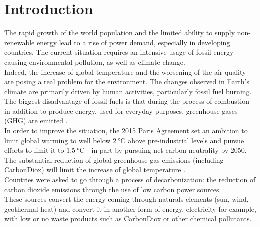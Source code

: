 \chapter{Introduction}

%
The rapid growth of the world population and the limited ability to supply non-renewable energy lead to a rise of power demand, especially in developing countries. The current situation requires an intensive usage of fossil energy causing environmental pollution, as well as climate change. \\

Indeed, the increase of global temperature and the worsening of the air quality are posing a real problem for the environment. The changes observed in Earth’s climate are primarily driven by human activities, particularly fossil fuel burning. The biggest disadvantage of fossil fuels is that during the process of combustion in addition to produce energy, used for everyday purposes, greenhouse gases (\gls{GHG}) are emitted \cite{greenhousegasemissions}. \\

In order to improve the situation, the 2015 Paris Agreement set an ambition to limit global warming to well below $\SI{2}{\degreeCelsius}$ above pre-industrial levels and pursue efforts to limit it to $\SI{1.5}{\degreeCelsius}$ - in part by pursuing net carbon neutrality by 2050. The substantial reduction of global greenhouse gas emissions (including \gls{CarbonDiox})  will limit the increase of global temperature \cite{french_conference}. \\
Countries were asked to go through a process of decarbonization: the reduction of carbon dioxide emissions through the use of low carbon power sources. \\
These sources convert the energy coming through naturals elements (sun, wind, geothermal heat) and convert it in another form of energy, electricity for example, with low or no waste products such as \gls{CarbonDiox} or other chemical pollutants. \\

